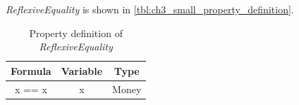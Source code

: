\textit{ReflexiveEquality} is shown in
\autoref{tbl:ch3_small_property_definition}.
\begin{table}[!ht]
\centering
\begin{tabular}{ccc}
\hline
\textbf{Formula} & \textbf{Variable} & \textbf{Type} \\ \hline
x == x & x & Money \\ \hline
\end{tabular}
\caption{Property definition of \textit{ReflexiveEquality}}
\label{tbl:ch3_small_property_definition}
\end{table}
\FloatBarrier\noindent

